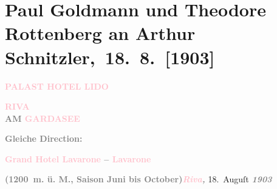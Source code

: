 

\renewcommand{\erwaehntePersonen}{Personen: Paul Goldmann, Theodore Rottenberg}
\renewcommand{\erwaehnteOrte}{Orte: Grand Hotel Lavarone, Hotel Carloni, Lago di Garda, Lavarone, Madonna di Campiglio, Palast Hotel Lido, Riva del Garda, Trient}
\renewcommand{\erwaehnteWerke}{}
\section[ Paul Goldmann und Theodore Rottenberg an Arthur Schnitzler, 18. 8. {[}1903{]}]{Paul Goldmann und Theodore Rottenberg an Arthur
               Schnitzler, 18. 8. {[}1903{]}}
\nopagebreak{}
\rehead{ }\normalsize\beginnumbering{}
\toendnotes[C]{\smallbreak\pagebreak[2]}
\toendnotes[C]{\smallbreak}
\pstart
           \noindent{}{\pb}\textcolor{gray}{\textbf{\textbf{\textcolor{pink}{PALAST HOTEL LIDO}{}\ledrightnote{\textcolor{pink}{Palast Hotel Lido}}}}}\pend
           
\pstart
           \textcolor{gray}{\textbf{\textbf{\textcolor{pink}{RIVA}{}\ledrightnote{\textcolor{pink}{Riva del Garda}}}}}{\\}\textcolor{gray}{\textbf{AM \textcolor{pink}{GARDASEE}{}\ledrightnote{\textcolor{pink}{Lago di Garda}}}}\pend
           
\pstart
           \textcolor{gray}{\textbf{Gleiche Direction:}}\pend
           
\pstart
           \textcolor{gray}{\textbf{\textbf{\textcolor{pink}{Grand Hotel Lavarone}{}\ledrightnote{\textcolor{pink}{Grand Hotel Lavarone}} – \textcolor{pink}{Lavarone}{}\ledrightnote{\textcolor{pink}{Lavarone}}}}}\pend
           
\pstart
           \textcolor{gray}{\textbf{(1200 m. ü. M., Saison Juni bis October)}}\hfill \textcolor{gray}{\textbf{\emph{\textcolor{pink}{Riva}{}\ledrightnote{\textcolor{pink}{Riva del Garda}},}}}{ }18. Auguſt \textcolor{gray}{\textbf{\emph{1903}}}\pend
           
